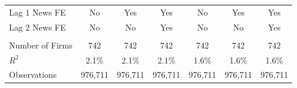 \documentclass[border=0.2cm]{standalone}
\begin{document}
\begin{tabular}{lcccccc}
    Lag 1 News FE     & No                                             & Yes                                            & Yes                                            & No                                              & Yes                                            & Yes                                            \\
    Lag 2 News FE     & No                                             & No                                             & Yes                                            & No                                              & No                                             & Yes                                            \\
    \vspace{4pt}      & \begin{footnotesize}\end{footnotesize}         & \begin{footnotesize}\end{footnotesize}         & \begin{footnotesize}\end{footnotesize}         & \begin{footnotesize}\end{footnotesize}          & \begin{footnotesize}\end{footnotesize}         & \begin{footnotesize}\end{footnotesize}         \\
    Number of Firms   & 742                                            & 742                                            & 742                                            & 742                                             & 742                                            & 742                                            \\
    $R^2$             & 2.1\%                                          & 2.1\%                                          & 2.1\%                                          & 1.6\%                                           & 1.6\%                                          & 1.6\%                                          \\
    Observations      & 976,711                                        & 976,711                                        & 976,711                                        & 976,711                                         & 976,711                                        & 976,711                                        \\

\end{tabular}
\end{document}

